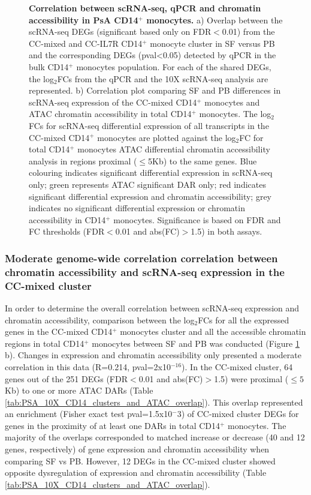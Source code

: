 \begin{figure}[H]
\caption[Correlation between scRNA-seq, qPCR and chromatin accessibility in PsA CD14$^+$ monocytes.]{\textbf{Correlation between scRNA-seq, qPCR and chromatin accessibility in PsA CD14$^+$ monocytes.} a) Overlap between the scRNA-seq DEGs (significant based only on FDR$<$0.01) from the CC-mixed and CC-IL7R CD14$^+$ monocyte cluster in SF versus PB and the corresponding DEGs (pval<0.05) detected by qPCR in the bulk CD14$^+$ monocytes population. For each of the shared DEGs, the log$_2$FCs from the qPCR and the 10X scRNA-seq analysis are represented. b) Correlation plot comparing SF and PB differences in scRNA-seq expression of the CC-mixed CD14$^+$ monocytes and ATAC chromatin accessibility in total CD14$^+$ monocytes. The log$_2$FCs for scRNA-seq differential expression of all transcripts in the CC-mixed CD14$^+$ monocytes are plotted against the log$_2$FC for total CD14$^+$ monocytes ATAC differential chromatin accessibility analysis in regions proximal ($\leq$5Kb) to the same genes. Blue colouring indicates significant differential expression in scRNA-seq only; green represents ATAC significant DAR only; red indicates significant differential expression and chromatin accessibility; grey indicates no significant differential expression or chromatin accessibility in CD14$^+$ monocytes. Significance is based on FDR and FC thresholds (FDR$<$0.01 and abs(FC)$>$1.5) in both assays.}
\label{figure:PsA_scRNAseq_qPCR_ATAC_correlation}
\end{figure}





\subsubsection{Moderate genome-wide correlation correlation between chromatin accessibility and scRNA-seq expression in the CC-mixed cluster}
In order to determine the overall correlation between scRNA-seq expression and chromatin accessibility, comparison between the log$_2$FCs for all the expressed genes in the CC-mixed CD14$^+$ monocytes cluster and all the accessible chromatin regions in total CD14$^+$ monocytes between SF and PB was conducted (Figure \ref{figure:PsA_scRNAseq_qPCR_ATAC_correlation} b). Changes in expression and chromatin accessibility only presented a moderate correlation in this data (R=0.214, pval=2x10$^{-16}$). In the CC-mixed cluster, 64 genes out of the 251 DEGs (FDR$<$0.01 and abs(FC)$>$1.5) were proximal ($\leq5$Kb) to one or more ATAC DARs (Table \ref{tab:PSA_10X_CD14_clusters_and_ATAC_overlap}). This overlap represented an enrichment (Fisher exact test pval=1.5x10$^-3$) of CC-mixed cluster DEGs for genes in the proximity of at least one DARs in total CD14$^+$ monocytes. The majority of the overlaps corresponded to matched increase or decrease (40 and 12 genes, respectively) of gene expression and chromatin accessibility when comparing SF vs PB. However, 12 DEGs in the CC-mixed cluster showed opposite dysregulation of expression and chromatin accessibility (Table \ref{tab:PSA_10X_CD14_clusters_and_ATAC_overlap}). 

